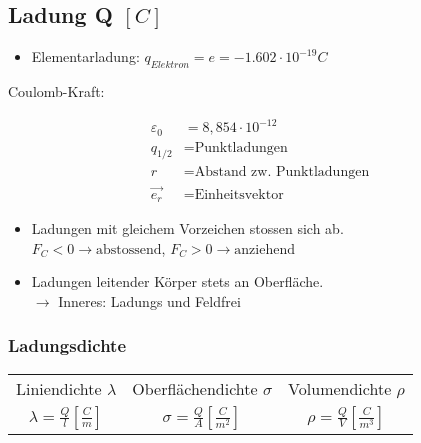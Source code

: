 \subsection{Ladung Q \hfill $[C]$}
    \begin{itemize}
        \item Elementarladung: $q_{Elektron} = e = - 1.602 \cdot 10^{-19}C$
    \end{itemize}

    Coulomb-Kraft: 

    \begin{minipage}{0.53\linewidth}
        \begin{footnotesize}
            \begin{center}
            \end{center}
        \end{footnotesize}
    \end{minipage}
    \begin{minipage}{0.46\linewidth}
        \begin{scriptsize}
            \begin{center}
                \begin{align*}
                    \varepsilon_0 &= 8,854\cdot10^{-12}
                    \\q_{1/2} &= \text{Punktladungen}
                    \\r &= \text{Abstand zw. Punktladungen}
                    \\\vec{e_r} &= \text{Einheitsvektor}
                \end{align*}
            \end{center}
        \end{scriptsize}
    \end{minipage}
    \vspace{1mm}



    \begin{itemize}
        \item Ladungen mit gleichem Vorzeichen stossen sich ab.
        \\$F_C<0 \rightarrow \text{abstossend}$,
        $F_C>0 \rightarrow \text{anziehend}$
        \item Ladungen leitender Körper stets an Oberfläche.\\
        $\rightarrow$ Inneres: Ladungs und Feldfrei
    \end{itemize}

    \subsubsection{Ladungsdichte}
        \begin{tabular}{c c c}
            Liniendichte $\lambda$ & Oberflächendichte $\sigma$ & Volumendichte $\rho$ \\
            $\lambda = \frac{Q}{l} \left[\frac{C}{m}\right]$ & $\sigma = \frac{Q}{A} \left[\frac{C}{m^2}\right]$ & $\rho = \frac{Q}{V} \left[\frac{C}{m^3}\right]$
        \end{tabular}

